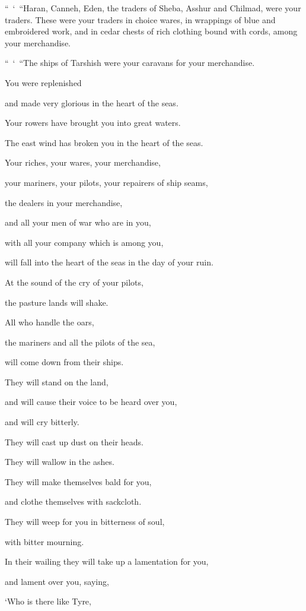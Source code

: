 \myverse{}“ ‘ “Haran, Canneh, Eden, the traders of Sheba, Asshur and Chilmad,
were your traders.
\myverse{}These were your traders in choice wares, in wrappings of blue and embroidered
work, and in cedar chests of rich clothing bound with cords, among your merchandise.

\myverse{}“ ‘ “The ships of Tarshish were your caravans for your merchandise.

You were replenished

and made very glorious in the heart of the seas.

\myverse{}Your rowers have brought you into great waters.

The east wind has broken you in the heart of the seas.

\myverse{}Your riches, your wares, your merchandise,

your mariners, your pilots, your repairers of ship seams,

the dealers in your merchandise,

and all your men of war who are in you,

with all your company which is among you,

will fall into the heart of the seas in the day of your ruin.

\myverse{}At the sound of the cry of your pilots,

the pasture lands will shake.

\myverse{}All who handle the oars,

the mariners and all the pilots of the sea,

will come down from their ships.

They will stand on the land,

\myverse{}and will cause their voice to be heard over you,

and will cry bitterly.

They will cast up dust on their heads.

They will wallow in the ashes.

\myverse{}They will make themselves bald for you,

and clothe themselves with sackcloth.

They will weep for you in bitterness of soul,

with bitter mourning.

\myverse{}In their wailing they will take up a lamentation for you,

and lament over you, saying,

‘Who is there like Tyre,

